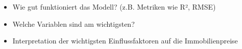 \begin{itemize}
    \item Wie gut funktioniert das Modell? (z.B. Metriken wie R², RMSE)
    \item Welche Variablen sind am wichtigsten?
    \item Interpretation der wichtigsten Einflussfaktoren auf die Immobilienpreise
\end{itemize}